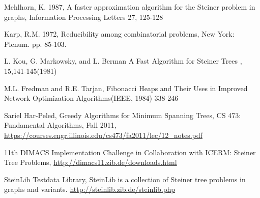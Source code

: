 \documentclass[a4paper,10pt]{article}
\begin{document}



\begin{thebibliography}{}

   Mehlhorn, K. 1987,
      A faster approximation algorithm for the Steiner problem in graphs,
      Information Processing Letters 27, 125-128

   Karp, R.M. 1972,
      \newblock Reducibility among combinatorial problems,
       New York: Plenum. pp. 85-103.
	
	  L. Kou, G. Markowsky, and L. Berman
	     \newblock A Fast Algorithm for Steiner Trees
	     , 15,141-145(1981)   
	
	
	  M.L. Fredman and R.E. Tarjan, Fibonacci Heaps 
	and Their Uses in Improved Network Optimization Algorithms(IEEE, 1984) 338-246

	  Sariel Har-Peled,
	\newblock Greedy Algorithms for Minimum
	Spanning Trees, CS 473: Fundamental Algorithms, Fall 2011,
	\url{https://courses.engr.illinois.edu/cs473/fa2011/lec/12_notes.pdf}
	
	 11th DIMACS Implementation Challenge in Collaboration with ICERM:
		Steiner Tree Problems,
		\url{http://dimacs11.zib.de/downloads.html}	
	
	 SteinLib Testdata Library,
		SteinLib is a collection of Steiner tree problems in graphs and variants.
			\url{http://steinlib.zib.de/steinlib.php}
	
	
\end{thebibliography}
\end{document}
